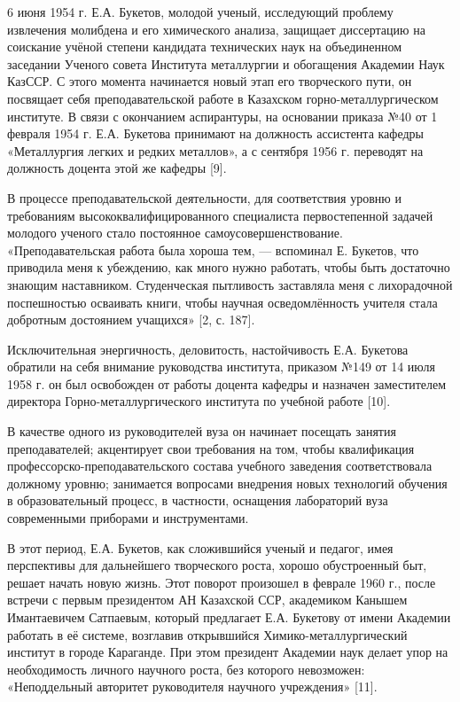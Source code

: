 6 июня 1954 г. Е.А. Букетов, молодой ученый, исследующий проблему
извлечения молибдена и его химического анализа, защищает диссертацию на
соискание учёной степени кандидата технических наук на объединенном
заседании Ученого совета Института металлургии и обогащения Академии
Наук КазССР. С этого момента начинается новый этап его творческого пути,
он посвящает себя преподавательской работе в Казахском
горно-металлургическом институте. В связи с окончанием аспирантуры, на
основании приказа №40 от 1 февраля 1954 г. Е.А. Букетова принимают на
должность ассистента кафедры «Металлургия легких и редких металлов», а с
сентября 1956 г. переводят на должность доцента этой же кафедры {[}9{]}.

В процессе преподавательской деятельности, для соответствия уровню и
требованиям высококвалифицированного специалиста первостепенной задачей
молодого ученого стало постоянное самоусовершенствование.
«Преподавательская работа была хороша тем, --- вспоминал Е. Букетов, что
приводила меня к убеждению, как много нужно работать, чтобы быть
достаточно знающим наставником. Студенческая пытливость заставляла меня
с лихорадочной поспешностью осваивать книги, чтобы научная
осведомлённость учителя стала добротным достоянием учащихся» {[}2, с.
187{]}.

Исключительная энергичность, деловитость, настойчивость Е.А. Букетова
обратили на себя внимание руководства института, приказом №149 от 14
июля 1958 г. он был освобожден от работы доцента кафедры и назначен
заместителем директора Горно-металлургического института по учебной
работе {[}10{]}.

В качестве одного из руководителей вуза он начинает посещать занятия
преподавателей; акцентирует свои требования на том, чтобы квалификация
профессорско-преподавательского состава учебного заведения
соответствовала должному уровню; занимается вопросами внедрения новых
технологий обучения в образовательный процесс, в частности, оснащения
лабораторий вуза современными приборами и инструментами.

В этот период, Е.А. Букетов, как сложившийся ученый и педагог, имея
перспективы для дальнейшего творческого роста, хорошо обустроенный быт,
решает начать новую жизнь. Этот поворот произошел в феврале 1960 г.,
после встречи с первым президентом АН Казахской ССР, академиком Канышем
Имантаевичем Сатпаевым, который предлагает Е.А. Букетову от имени
Академии работать в её системе, возглавив открывшийся
Химико-металлургический институт в городе Караганде. При этом президент
Академии наук делает упор на необходимость личного научного роста, без
которого невозможен: «Неподдельный авторитет руководителя научного
учреждения» {[}11{]}.

